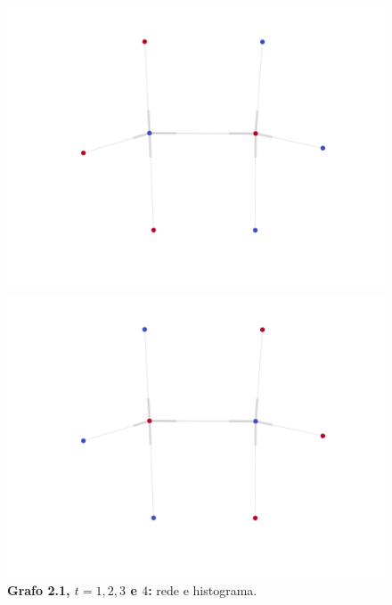 \begin{frame}
\begin{figure}
\begin{minipage}{4cm}
    \includegraphics[width=\textwidth]{./figures/21N2}
  \end{minipage}
  \begin{minipage}{4cm}
    \includegraphics[width=\textwidth]{./figures/21N1}
  \end{minipage}
  \vspace{5mm}
  \caption*{\textbf{Grafo 2.1, $t = 1, 2, 3$ e $4$:} rede e histograma.}
  \end{figure}
\end{frame}

